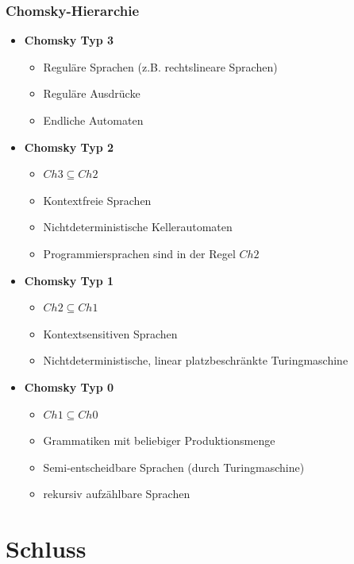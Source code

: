 \begin{frame}
	\frametitle{Chomsky-Hierarchie}
	\begin{itemize}
		\item \textbf{Chomsky Typ 3}
		\begin{itemize}
			\item Reguläre Sprachen (z.B. rechtslineare Sprachen)
			\item Reguläre Ausdrücke
			\item Endliche Automaten
		\end{itemize}
		\item \textbf{Chomsky Typ 2}
		\begin{itemize}
			\item $Ch3 \subseteq Ch2$
			\item Kontextfreie Sprachen
			\item Nichtdeterministische Kellerautomaten
			\item Programmiersprachen sind in der Regel $Ch2$
		\end{itemize}
		\item \textbf{Chomsky Typ 1}
		\begin{itemize}
			\item $Ch2 \subseteq Ch1$
			\item Kontextsensitiven Sprachen
			\item Nichtdeterministische, linear platzbeschränkte Turingmaschine
		\end{itemize}
		\item \textbf{Chomsky Typ 0}
		\begin{itemize}
			\item $Ch1 \subseteq Ch0$
			\item Grammatiken mit beliebiger Produktionsmenge
			\item Semi-entscheidbare Sprachen (durch Turingmaschine)
			\item rekursiv aufzählbare Sprachen
		\end{itemize}
	\end{itemize}
\end{frame}

\section{Schluss}
